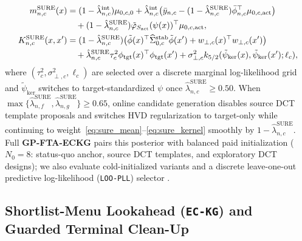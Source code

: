 \begin{align}
  m_{n,c}^{\mathrm{SURE}}(x) &= (1 - \hat{\lambda}_{n,c}^{\mathrm{int}})\mu_{0,c,0} + \hat{\lambda}_{n,c}^{\mathrm{int}}\big(\bar{y}_{n,c} - (1 - \hat{\lambda}_{n,c}^{\mathrm{SURE}})\bar{\phi}_{n,c}^\top\mu_{0,c,\mathrm{act}}\big) \notag\\
  &\quad + (1 - \hat{\lambda}_{n,c}^{\mathrm{SURE}})\tilde{\varphi}_{S_{\mathrm{act}}}(\psi(x))^\top\mu_{0,c,\mathrm{act}}, \label{eq:sure_mean}\\
  K_{n,c}^{\mathrm{SURE}}(x, x') &= (1 - \hat{\lambda}_{n,c}^{\mathrm{SURE}})\big(\tilde{\phi}(x)^\top \widehat{\Sigma}_{0,c}^{\mathrm{stab}}\tilde{\phi}(x') + w_{\perp,c}(x)^\top w_{\perp,c}(x')\big) \notag\\
  &\quad + \hat{\lambda}_{n,c}^{\mathrm{SURE}}\tau_c^2 \phi_{\mathrm{tgt}}(x)^\top\phi_{\mathrm{tgt}}(x') + \sigma_{\perp,c}^2 k_{5/2}(\tilde{\psi}_{\mathrm{ker}}(x), \tilde{\psi}_{\mathrm{ker}}(x'); \ell_c), \label{eq:sure_kernel}
\end{align}
where $(\tau_c^2, \sigma_{\perp,c}^2, \ell_c)$ are selected over a discrete marginal log-likelihood grid and $\tilde{\psi}_{\mathrm{ker}}$ switches to target-standardized $\psi$ once $\hat{\lambda}_{n,c}^{\mathrm{SURE}} \ge 0.50$. When $\max\{\hat{\lambda}_{n,f}^{\mathrm{SURE}}, \hat{\lambda}_{n,g}^{\mathrm{SURE}}\} \ge 0.65$, online candidate generation disables source DCT template proposals and switches HVD regularization to target-only while continuing to weight~\eqref{eq:sure_mean}--\eqref{eq:sure_kernel} smoothly by $1 - \hat{\lambda}_{n,c}^{\mathrm{SURE}}$. Full \textbf{GP-FTA-ECKG} pairs this posterior with balanced paid initialization ($N_0=8$: status-quo anchor, source DCT templates, and exploratory DCT designs); we also evaluate cold-initialized variants and a discrete leave-one-out predictive log-likelihood (\texttt{LOO-PLL}) selector \citep[Eq.~5.12 of][]{rasmussen2006gaussian}.

\subsection{Shortlist-Menu Lookahead (\texttt{EC-KG}) and Guarded Terminal Clean-Up}

